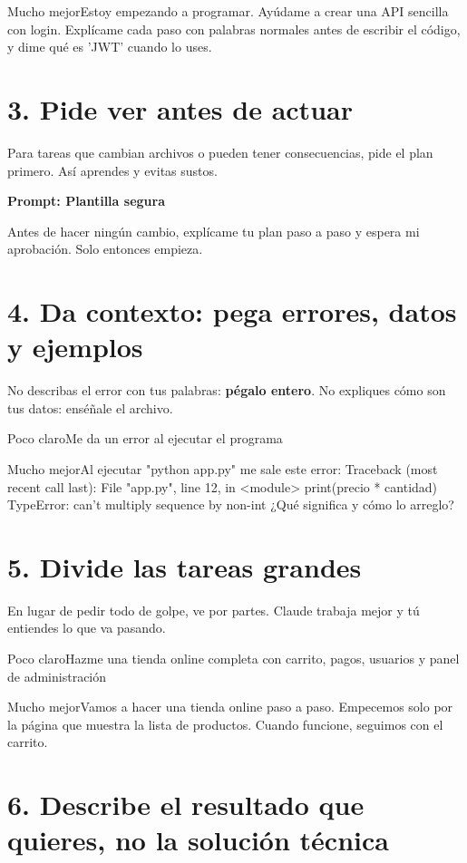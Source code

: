 \documentclass[11pt,a4paper]{report}
\begin{document}
 Mucho mejorEstoy empezando a programar. Ayúdame a crear una API sencilla con login. Explícame cada paso con palabras normales antes de escribir el código, y dime qué es 'JWT' cuando lo uses.

\section{3. Pide ver antes de actuar}

Para tareas que cambian archivos o pueden tener consecuencias, pide el plan primero. Así aprendes y evitas sustos.

\noindent\textbf{Prompt: Plantilla segura}
\begin{codebox}
Antes de hacer ningún cambio, explícame tu plan paso a paso y espera mi aprobación. Solo entonces empieza.
\end{codebox}

\section{4. Da contexto: pega errores, datos y ejemplos}

No describas el error con tus palabras: \textbf{pégalo entero}. No expliques cómo son tus datos: enséñale el archivo.

 Poco claroMe da un error al ejecutar el programa

 Mucho mejorAl ejecutar "python app.py" me sale este error: Traceback (most recent call last): File "app.py", line 12, in <module> print(precio * cantidad) TypeError: can't multiply sequence by non-int ¿Qué significa y cómo lo arreglo?

\section{5. Divide las tareas grandes}

En lugar de pedir todo de golpe, ve por partes. Claude trabaja mejor y tú entiendes lo que va pasando.

 Poco claroHazme una tienda online completa con carrito, pagos, usuarios y panel de administración

 Mucho mejorVamos a hacer una tienda online paso a paso. Empecemos solo por la página que muestra la lista de productos. Cuando funcione, seguimos con el carrito.

\section{6. Describe el resultado que quieres, no la solución técnica}
\end{document}
